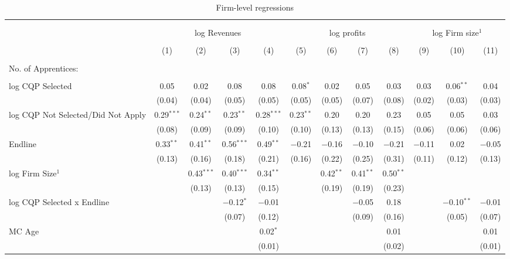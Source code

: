 \documentclass[
  11pt,
a4paper
]{report}
\begin{document}
\begin{table}[H] \centering 
  \caption{Firm-level regressions} 
  \label{tab:tbl-firmregs} 
\scriptsize 
\begin{tabular}{@{\extracolsep{-8pt}}lccccccccccc} 
\\[-1.8ex]\hline 
\hline \\[-1.8ex] 
\\[-1.8ex] & \multicolumn{4}{c}{log Revenues} & \multicolumn{4}{c}{log profits} & \multicolumn{3}{c}{log Firm size$^1$} \\ 
\\[-1.8ex] & (1) & (2) & (3) & (4) & (5) & (6) & (7) & (8) & (9) & (10) & (11)\\ 
\hline \\[-1.8ex] 
 No. of Apprentices: \\ \\
                               log CQP Selected & 0.05 & 0.02 & 0.08 & 0.08 & 0.08$^{*}$ & 0.02 & 0.05 & 0.03 & 0.03 & 0.06$^{**}$ & 0.04 \\ 
  & (0.04) & (0.04) & (0.05) & (0.05) & (0.05) & (0.05) & (0.07) & (0.08) & (0.02) & (0.03) & (0.03) \\ 
  log CQP Not Selected/Did Not Apply & 0.29$^{***}$ & 0.24$^{**}$ & 0.23$^{**}$ & 0.28$^{***}$ & 0.23$^{**}$ & 0.20 & 0.20 & 0.23 & 0.05 & 0.05 & 0.03 \\ 
  & (0.08) & (0.09) & (0.09) & (0.10) & (0.10) & (0.13) & (0.13) & (0.15) & (0.06) & (0.06) & (0.06) \\ 
  Endline & 0.33$^{**}$ & 0.41$^{**}$ & 0.56$^{***}$ & 0.49$^{**}$ & $-$0.21 & $-$0.16 & $-$0.10 & $-$0.21 & $-$0.11 & 0.02 & $-$0.05 \\ 
  & (0.13) & (0.16) & (0.18) & (0.21) & (0.16) & (0.22) & (0.25) & (0.31) & (0.11) & (0.12) & (0.13) \\ 
  log Firm Size$^1$ &  & 0.43$^{***}$ & 0.40$^{***}$ & 0.34$^{**}$ &  & 0.42$^{**}$ & 0.41$^{**}$ & 0.50$^{**}$ &  &  &  \\ 
  &  & (0.13) & (0.13) & (0.15) &  & (0.19) & (0.19) & (0.23) &  &  &  \\ 
  log CQP Selected x Endline &  &  & $-$0.12$^{*}$ & $-$0.01 &  &  & $-$0.05 & 0.18 &  & $-$0.10$^{**}$ & $-$0.01 \\ 
  &  &  & (0.07) & (0.12) &  &  & (0.09) & (0.16) &  & (0.05) & (0.07) \\ 
  MC Age &  &  &  & 0.02$^{*}$ &  &  &  & 0.01 &  &  & 0.01 \\ 
  &  &  &  & (0.01) &  &  &  & (0.02) &  &  & (0.01) \\ 

\end{tabular}
\end{table}
\end{document}
